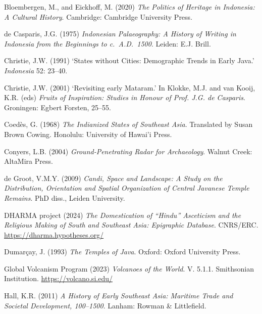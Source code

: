 \documentclass[12pt,a4paper]{article}
\begin{document}
\vspace{0.5em}
\noindent Bloembergen, M., and Eickhoff, M. (2020) \emph{The Politics of Heritage in Indonesia: A Cultural History}. Cambridge: Cambridge University Press.

\vspace{0.5em}
\noindent de Casparis, J.G. (1975) \emph{Indonesian Palaeography: A History of Writing in Indonesia from the Beginnings to c.~A.D.~1500}. Leiden: E.J. Brill.

\vspace{0.5em}
\noindent Christie, J.W. (1991) `States without Cities: Demographic Trends in Early Java.' \emph{Indonesia} 52: 23--40.

\vspace{0.5em}
\noindent Christie, J.W. (2001) `Revisiting early Mataram.' In Klokke, M.J. and van Kooij, K.R. (eds) \emph{Fruits of Inspiration: Studies in Honour of Prof. J.G. de Casparis}. Groningen: Egbert Forsten, 25--55.

\vspace{0.5em}
\noindent Coed\`{e}s, G. (1968) \emph{The Indianized States of Southeast Asia}. Translated by Susan Brown Cowing. Honolulu: University of Hawai'i Press.

\vspace{0.5em}
\noindent Conyers, L.B. (2004) \emph{Ground-Penetrating Radar for Archaeology}. Walnut Creek: AltaMira Press.

\vspace{0.5em}
\noindent de Groot, V.M.Y. (2009) \emph{Candi, Space and Landscape: A Study on the Distribution, Orientation and Spatial Organization of Central Javanese Temple Remains}. PhD diss., Leiden University.

\vspace{0.5em}
\noindent DHARMA project (2024) \emph{The Domestication of ``Hindu'' Asceticism and the Religious Making of South and Southeast Asia: Epigraphic Database}. CNRS/ERC. \url{https://dharma.hypotheses.org/}

\vspace{0.5em}
\noindent Dumar\c{c}ay, J. (1993) \emph{The Temples of Java}. Oxford: Oxford University Press.

\vspace{0.5em}
\noindent Global Volcanism Program (2023) \emph{Volcanoes of the World}. V. 5.1.1. Smithsonian Institution. \url{https://volcano.si.edu/}

\vspace{0.5em}
\noindent Hall, K.R. (2011) \emph{A History of Early Southeast Asia: Maritime Trade and Societal Development, 100--1500}. Lanham: Rowman \& Littlefield.
\end{document}
